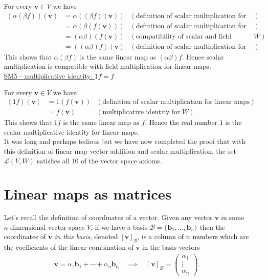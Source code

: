 \noindent For every $\mathbf{v}\in V$ we have
\begin{align*}
\left( \alpha(\beta f) \right)(\mathbf{v}) &= \alpha\left( (\beta f) (\mathbf{v}) \right)
 & (\text{definition of scalar multiplication for linear maps}) \\
%
 &= \alpha\left( \beta (f (\mathbf{v}))  \right)
 & (\text{definition of scalar multiplication for linear maps}) \\
%
 &= \left(\alpha \beta \right)(f (\mathbf{v}))
 & (\text{compatibility of scalar and field multiplication for $W$}) \\
%
 &= \left(\left( \alpha \beta \right)f \right) (\mathbf{v})
 & (\text{definition of scalar multiplication for linear maps})
\end{align*}
This shows that $\alpha(\beta f)$ is the same linear map as $(\alpha\beta) f$. Hence scalar multiplication is compatible with field multiplication for linear maps. 
\\


\noindent \underline{SM5 - multiplicative identity: $1f=f$}

\noindent For every $\mathbf{v}\in V$ we have
\begin{align*}
\left(1 f \right)(\mathbf{v}) &= 1\left( f(\mathbf{v}) \right)
 & (\text{definition of scalar multiplication for linear maps}) \\
%
 &= f (\mathbf{v})
 & (\text{multiplicative identity for $W$})
\end{align*}
This shows that $1f$ is the same linear map as $f$. Hence the real number $1$ is the scalar multiplicative identity for linear maps. \vspace{0.5cm} \\
\noindent It was long and perhaps tedious but we have now completed the proof that with this definition of linear map vector addition and scalar multiplication, the set $\mathcal{L}(V,W)$ satisfies all 10 of the vector space axioms.






\section{Linear maps as matrices}

Let's recall the definition of coordinates of a vector. Given any vector $\mathbf{v}$ in some $n$-dimensional vector space $V$, if we have a basis $\mathcal{B}=\{ \mathbf{b}_1, \dots, \mathbf{b}_n \}$ then the coordinates of $\mathbf{v}$ \textit{in this basis}, denoted $[\mathbf{v}]_\mathcal{B}$, is a column of $n$ numbers which are the coefficients of the linear combination of $\mathbf{v}$ in the basis vectors
\begin{align*}
\mathbf{v}=\alpha_1 \mathbf{b}_1 + \cdots + \alpha_n \mathbf{b}_n \quad\implies\quad [\mathbf{v}]_\mathcal{B} = \begin{pmatrix} \alpha_1 \\ \vdots \\ \alpha_n \end{pmatrix}.
\end{align*}

